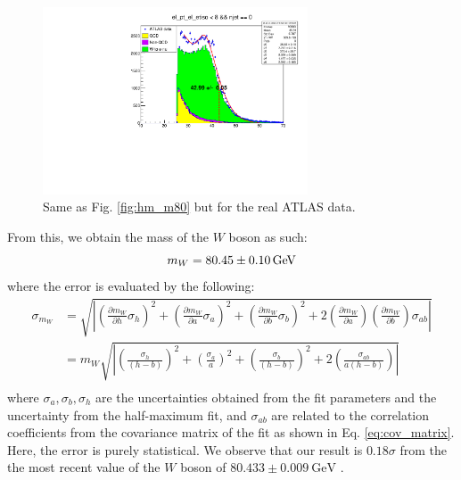 \documentclass[a4paper]{report}
\numberwithin{equation}{section}
\begin{document}
\begin{figure}[htpb]
    \centering
    \includegraphics[width=0.7\textwidth]{hm_atlas.pdf}
    \caption{Same as Fig. \ref{fig:hm_m80} but for the real ATLAS data.}
    \label{fig:hm_atlas}
\end{figure}

From this, we obtain the mass of the $W$ boson as such: 
\begin{equation}
    m_W = \SI{80.45 \pm 0.10}{\giga\electronvolt} 
\end{equation}
where the error is evaluated by the following:
\begin{align}
    \sigma_{m_W} &= \sqrt{\left| \left(\frac{\partial m_W}{\partial h} \sigma_h\right)^2 
                        + \left( \frac{\partial m_W}{\partial a} \sigma_a\right)^2 
                        + \left( \frac{\partial m_W}{\partial b} \sigma_b\right)^2
                        + 2 \left( \frac{\partial m_W}{\partial a}\right) \left( \frac{\partial m_W}{\partial b}\right) \sigma_{ab} \right|} \\
            &= m_W \sqrt{\left| \left(\frac{\sigma_h}{(h - b)}\right)^2 + \left(\frac{\sigma_a}{a}\right)^2 + 
                            \left(\frac{\sigma_b}{(h - b)}\right)^2 + 2\left(\frac{\sigma_{ab}}{a(h - b)}\right) \right|} \\
\end{align}
where $\sigma_a, \sigma_b, \sigma_h$ are the uncertainties obtained from the fit parameters and the uncertainty from the 
half-maximum fit, and $\sigma_{ab}$ are related to the correlation coefficients from the covariance matrix of the fit as shown in Eq. \ref{eq:cov_matrix}.
Here, the error is purely statistical. We observe that our result is $0.18\sigma$ from the 
 the most recent value of the $W$ boson of $80.433 \pm 0.009 \ \text{GeV}$ \cite{CDF:2022hxs}. \par
\end{document}
